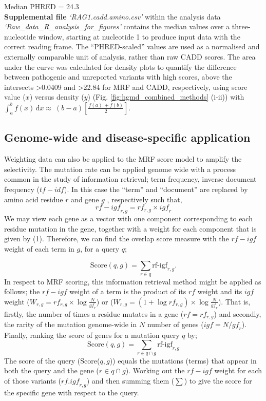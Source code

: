 \documentclass[preprint,11pt,fleqn]{elsarticle}
\begin{document}
\noindent Median PHRED = 24.3 \\
\textbf{Supplemental file} \textit{`RAG1.cadd.amino.csv'} within the analysis data \textit{`Raw\_data\_R\_analysis\_for\_figures'} contains the  median values over a three-nucleotide window, starting at nucleotide 1 to produce input data with the correct reading frame. 
The ``PHRED-scaled'' values are used as a normalised and externally comparable unit of analysis, rather than raw CADD scores. 
The area under the curve was calculated for density plots to quantify the difference between pathogenic and unreported variants with high scores, above the intersects >0.0409 and >22.84 for MRF and CADD, respectively, using score value ($x$) versus density ($y$) (Fig.
\ref{fig:hgmd_combined_methods} (i-ii)) with 
$\int_a^b \! f(x) \, \mathrm{d}x \approx\ \left(b-a\right) \left[\frac{f\left(a\right)\ + f\left(b\right)}{2}\right].$

\subsection*{\textbf{Genome-wide and disease-specific application}}
\noindent Weighting data can also be applied to the MRF score model to amplify the selectivity. 
The mutation rate can be applied genome wide with a process common in the study of information retrieval; term frequency, inverse document frequency ($tf-idf$).
In this case the “term” and “document” are replaced by amino acid residue $r$ and gene $g$ , respectively such that,
\newcommand{\dd}[1]{\mathrm{d}#1}
\begin{equation}
{rf-igf}_{r,g} ={rf}_{r,g} \times {igf}_r
\end{equation}
We may view each gene as a vector with one component corresponding to each residue mutation in the gene, together with a weight for each component that is given by (1). 
Therefore, we can find the overlap score measure with the ${rf-igf}$ weight of each term in $g$, for a query $q$;

\begin{displaymath}
\mbox{Score}(q,g)=\sum_{r\in q} \mbox{rf-igf}_{r,g}.
\end{displaymath}
In respect to MRF scoring, this information retrieval method might be applied as follows; the ${rf-igf}$ weight of a term is the product of its $rf$ weight and its $igf$ weight (${W}_{r,g}={rf}_{r,g} \times \log \frac{N}{{gf}_{r}}$) or (${W}_{r,g}=(1 + \log {rf}_{r,g}) \times \log \frac{N}{{gf}_{r}}$). 
That is, firstly, the number of times a residue mutates in a gene ($rf={rf}_{r,g}$) and secondly, the rarity of the mutation genome-wide in $N$ number of genes ($igf=N/{gf}_{r}$). 
Finally, ranking the score of genes for a mutation query $q$ by; 
\begin{displaymath}
\mbox{Score}(q,g)=\sum_{r\in q\cap g} \mbox{rf-igf}_{r,g}
\end{displaymath}
\noindent The score of the query (Score($q,g$)) equals the mutations (terms) that appear in both the query and the gene ($r\in q\cap g$). 
Working out the $rf-igf$ weight for each of those variants (${rf.igf}_{r,g}$) and then summing them ($\sum$) to give the score for the specific gene with respect to the query.
\end{document}
